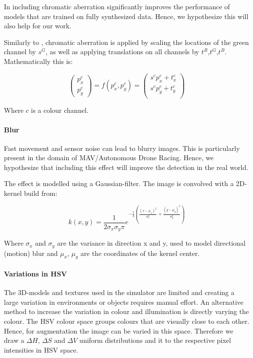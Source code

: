 In \cite{Carlson2018} including chromatic aberration significantly improves the performance of models that are trained on fully synthesized data. Hence, we hypothesize this will also help for our work.

Similarly to \cite{Carlson2018}, chromatic aberration is applied by scaling the locations of the green channel by $s^G$, as well as applying translations on all channels by $t^R$,$t^G$,$t^B$. Mathematically this is:

\begin{equation}
\begin{pmatrix}
p_x^c \\
p_y^c  
\end{pmatrix}= f(p_x^c,p_y^c) = \begin{pmatrix}
s^c p_x^c + t_x^c \\
s^c p_y^c + t_y^c \\
\end{pmatrix} 
\end{equation}

Where $c$ is a colour channel.

\paragraph{Blur}

Fast movement and sensor noise can lead to blurry images. This is particularly present in the domain of \ac{MAV}/Autonomous Drone Racing. Hence, we hypothesize that including this effect will improve the detection in the real world. 

The effect is modelled using a Gaussian-filter. The image is convolved with a 2D-kernel build from:

\begin{equation}
k(x,y) = \frac{1}{2\sigma_x\sigma_y\pi}e^{-\frac{1}{2}({\frac{(x-\mu_x)^2}{\sigma_x^2} + \frac{(y-\mu_y)^2}{\sigma_y^2}})}
\end{equation}

Where $\sigma_x$ and $\sigma_y$ are the variance in direction x and y, used to model directional (motion) blur and $\mu_x$, $\mu_y$ are the coordinates of the kernel center. 

\paragraph{Variations in \ac{HSV}}

The 3D-models and textures used in the simulator are limited and creating a large variation in environments or objects requires manual effort. An alternative method to increase the variation in colour and illumination is directly varying the colour. The \ac{HSV} colour space groups colours that are visually close to each other. Hence, for augmentation the image can be varied in this space. Therefore we draw a $\Delta H$, $\Delta S$ and $\Delta V$ uniform distributions and it to the respective pixel intensities in HSV space.
 

